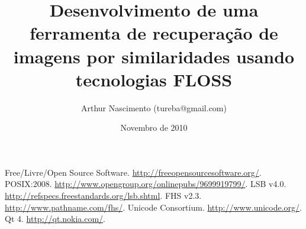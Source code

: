 \documentclass[10pt,a4paper]{article}
\title{Desenvolvimento de uma ferramenta de recuperação de imagens por similaridades usando tecnologias FLOSS\cite{FLOSS}}
\author{Arthur Nascimento (tureba@gmail.com)}
\date{Novembro de 2010}
\begin{document}
\maketitle


\begin{thebibliography}{99}

	 Free/Livre/Open Source Software. \url{http://freeopensourcesoftware.org/}.
         POSIX:2008. \url{http://www.opengroup.org/onlinepubs/9699919799/}.
	 LSB v4.0. \url{http://refspecs.freestandards.org/lsb.shtml}.
	 FHS v2.3. \url{http://www.pathname.com/fhs/}.
	 Unicode Consortium. \url{http://www.unicode.org/}.
	 Qt 4. \url{http://qt.nokia.com/}.

\end{thebibliography}
\end{document}
